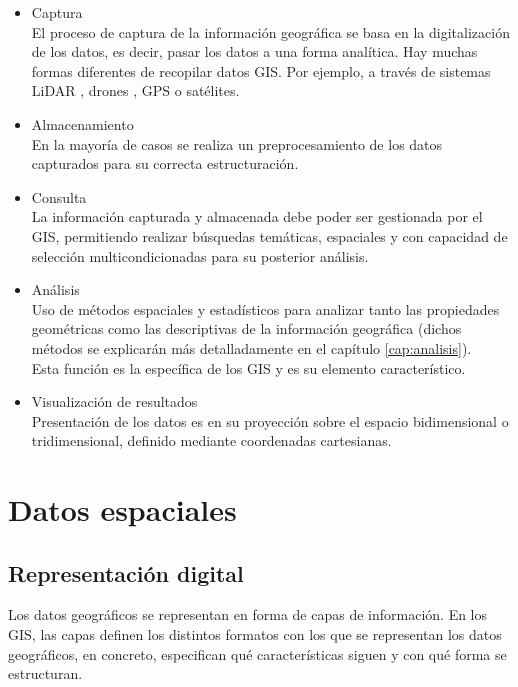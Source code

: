\begin{itemize}
\item Captura \\
El proceso de captura de la información geográfica se basa en la digitalización de los datos, es decir, pasar los datos a una forma analítica. 
Hay muchas formas diferentes de recopilar datos GIS. Por ejemplo, a través de sistemas LiDAR , drones , GPS o satélites.
\item Almacenamiento \\
En la mayoría de casos se realiza un preprocesamiento de los datos capturados para su correcta estructuración.
\item Consulta \\
La información capturada y almacenada debe poder ser gestionada por el GIS, permitiendo realizar búsquedas temáticas, espaciales y con capacidad de
selección multicondicionadas para su posterior análisis.
\item Análisis \\
Uso de métodos espaciales y estadísticos para analizar tanto las propiedades geométricas como las descriptivas de la información geográfica
(dichos métodos se explicarán más detalladamente en el capítulo \ref{cap:analisis}).\\
Esta función es la específica de los GIS y es su elemento característico. 
\item Visualización de resultados \\
Presentación de los datos es en su proyección sobre el espacio bidimensional o tridimensional, definido mediante coordenadas cartesianas.
\end{itemize}

\section{Datos espaciales} \label{sec:datos}

\subsection{Representación digital} 
Los datos geográficos se representan en forma de capas de información.
En los GIS, las capas definen los distintos formatos con los que se representan los datos geográficos, en concreto,
especifican qué características siguen y con qué forma se estructuran.

